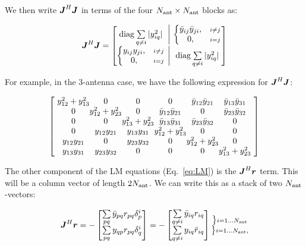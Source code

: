 \documentclass[useAMS,usenatbib]{mn2e}
\newcommand{\mat}[1]{{\bmath{#1}}}
\newcommand{\JJ}{\mat{J}} %
\begin{document}
We then write $\JJ^H\JJ$ in terms of the four $N_\mathrm{ant}\times N_\mathrm{ant}$ blocks as:

\begin{equation}
\label{eq:JHJ:DI}
\JJ^H \JJ = \Matrix{c@{~\bigg |~}c}{
\mathrm{diag} \sum\limits_{q\ne i} |y_{iq}^2| & 
  \left \{ 
  \begin{array}{@{}cc@{}}
   \bar{y}_{ij} \bar{y}_{ji}, &{\scriptstyle i\ne j} \\
   0, &{\scriptstyle i=j}
  \end{array} \right .\\
  \left \{ 
  \begin{array}{@{}cc@{}}
   y_{ij}y_{ji},&{\scriptstyle i\ne j} \\
   0, &{\scriptstyle i=j}
  \end{array} \right . 
  & \mathrm{diag} \sum\limits_{q\ne i} |y^2_{iq}| 
}
\end{equation}

For example, in the 3-antenna case, we have the following expression for
$\JJ^H \JJ$:

\newcommand{\yysq}[2]{{y^2_{#1}+y^2_{#2}}}
\newcommand{\bb}[2]{{\bar{y}_{#1#2}\bar{y}_{#2#1}}}
\newcommand{\bbb}[2]{y_{#1#2}y_{#2#1}}

\[
{\scriptstyle
\Matrix{@{~}c@{}c@{}c@{}c@{}c@{}c@{~}}{
\yysq{12}{13} & 0             & 0             & 0             & \bb{1}{2}       & \bb{1}{3} \\
0             & \yysq{12}{23} & 0             & \bb{1}{2}       & 0             & \bb{2}{3} \\
0             & 0             & \yysq{13}{23} & \bb{1}{3}       & \bb{2}{3}       & 0       \\
0             & \bbb{1}{2}      & \bbb{1}{3}      & \yysq{12}{13} & 0             & 0       \\ 
\bbb{1}{2}      & 0             & \bbb{2}{3}      & 0             & \yysq{12}{23} & 0 \\
\bbb{1}{3}      & \bbb{2}{3}      & 0             & 0             & 0             &  \yysq{13}{23}  
}
}
\]

The other component of the LM equations (Eq.~\ref{eq:LM}) is the $\JJ^H\bmath{r}$ term. This will be a column
vector of length $2N_\mathrm{ant}$. We can write this as a stack of two $N_\mathrm{ant}$-vectors:


\begin{equation}
\label{eq:JHR:DI}
\JJ^H\bmath{r} = -\Matrix{c}{ 
\sum\limits_{pq} \bar{y}_{pq} r_{pq} \delta^{i}_p  \\
\sum\limits_{pq} y_{qp} r_{pq} \delta^{i}_q 
} = -\Matrix{c}{
\sum\limits_{q\ne i} \bar{y}_{iq} r_{iq}   \\
\sum\limits_{q\ne i} y_{iq} \bar{r}_{iq}  
}
\Stack{
\big \} \scriptstyle i=1\dots \Na \\ 
\big \} \scriptstyle i=1\dots \Na,
}
\end{equation}
\end{document}
